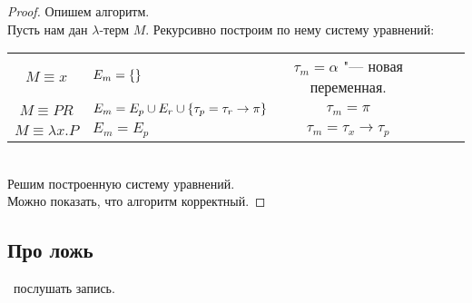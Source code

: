 \begin{proof}
    Опишем алгоритм.\\
    Пусть нам дан $\lambda$-терм $M$. Рекурсивно построим по нему систему уравнений: \\
    \begin{tabular}{Sl|Sl|Sl}
        $M \equiv x$ & $E_m=\left\{\right\}$ & $\tau_m=\alpha$ "--- новая переменная. \\
        $M \equiv PR$ & $E_m=E_p \cup E_r \cup \left\{\tau_p=\tau_r\rightarrow\pi\right\}$ & $\tau_m=\pi$ \\
        $M \equiv \lambda x . P$ & $E_m=E_p$ & $\tau_m=\tau_x\rightarrow\tau_p$ \\
    \end{tabular} \\
    Решим построенную систему уравнений.\\
    Можно показать, что алгоритм корректный.
\end{proof}

\begin{example}
    \todo %
\end{example}

\subsection{\texorpdfstring{Про ложь}{About false}}

\todo\ послушать запись. %
